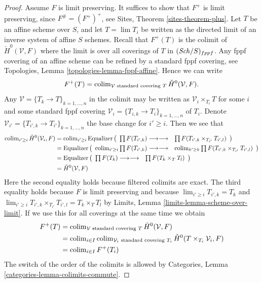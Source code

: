 \begin{proof}
Assume $F$ is limit preserving.
It suffices to show that $F^+$ is limit preserving, since
$F^\# = (F^+)^+$, see
Sites, Theorem \ref{sites-theorem-plus}.
Let $T$ be an affine scheme over $S$, and let $T = \lim T_i$ be written
as the directed limit of an inverse system of affine $S$ schemes.
Recall that $F^+(T)$ is the colimit of $\check H^0(\mathcal{V}, F)$
where the limit is over all coverings of $T$ in $(\mathit{Sch}/S)_{fppf}$.
Any fppf covering of an affine scheme can be refined by a standard
fppf covering, see
Topologies, Lemma \ref{topologies-lemma-fppf-affine}.
Hence we can write
$$
F^+(T)
=
\operatorname{colim}_{\mathcal{V}\text{ standard covering }T}
\check H^0(\mathcal{V}, F).
$$
Any $\mathcal{V} = \{T_k \to T\}_{k = 1, \ldots, n}$
in the colimit may be written as
$\mathcal{V}_i \times_{T_i} T$ for some $i$ and some standard fppf covering
$\mathcal{V}_i = \{T_{i, k} \to T_i\}_{k = 1, \ldots, n}$ of $T_i$.
Denote $\mathcal{V}_{i'} = \{T_{i', k} \to T_{i'}\}_{k = 1, \ldots, n}$
the base change for $i' \geq i$. Then we see that
\begin{align*}
\operatorname{colim}_{i' \geq i} \check H^0(\mathcal{V}_i, F)
& =
\operatorname{colim}_{i' \geq i}
\text{Equalizer}
\left(
\begin{array}{cc}\prod F(T_{i', k})
\longrightarrow\longrightarrow & \prod F(T_{i', k} \times_{T_{i'}} T_{i', l})\end{array}
\right)
\\
& =
\text{Equalizer}
\left(
\begin{array}{cc}\operatorname{colim}_{i' \geq i}
\prod F(T_{i', k})
\longrightarrow\longrightarrow & \operatorname{colim}_{k' \geq k}
\prod F(T_{i', k} \times_{T_{i'}} T_{i', l})\end{array}
\right)
\\
& =
\text{Equalizer}
\left(
\begin{array}{cc}\prod F(T_k)
\longrightarrow\longrightarrow & \prod F(T_k \times_T T_l)\end{array}
\right)
\\
& =
\check H^0(\mathcal{V}, F)
\end{align*}
Here the second equality holds because filtered colimits are exact.
The third equality holds because $F$ is limit preserving and because
$\lim_{i' \geq i} T_{i', k} = T_k$ and
$\lim_{i' \geq i} T_{i', k} \times_{T_{i'}} T_{i', l} = T_k \times_T T_l$
by Limits, Lemma \ref{limits-lemma-scheme-over-limit}.
If we use this for all coverings at the same time we obtain
\begin{align*}
F^+(T)
& =
\operatorname{colim}_{\mathcal{V}\text{ standard covering }T} \check H^0(\mathcal{V}, F) \\
& =
\operatorname{colim}_{i \in I}
\operatorname{colim}_{\mathcal{V}_i\text{ standard covering }T_i}
\check H^0(T \times_{T_i}\mathcal{V}_i, F) \\
& =
\operatorname{colim}_{i \in I} F^+(T_i)
\end{align*}
The switch of the order of the colimits is allowed by
Categories, Lemma \ref{categories-lemma-colimits-commute}.
\end{proof}

